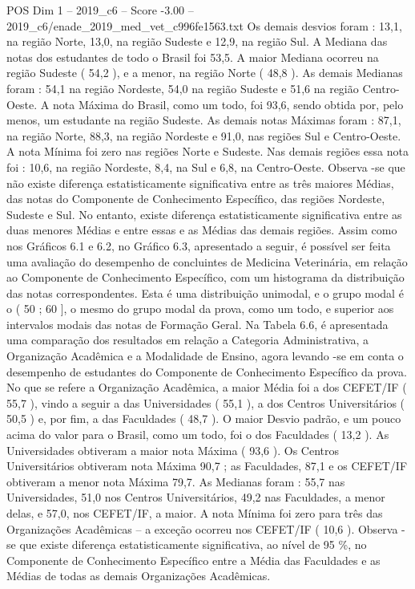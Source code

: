\begin{textsample}{POS Dim 1 – 2019\_c6 – Score -3.00 – 2019\_c6/enade\_2019\_med\_vet\_c996fe1563.txt}
Os demais desvios foram : 13,1, na região Norte, 13,0, na região Sudeste e 12,9, na região Sul.
A Mediana das notas dos estudantes de todo o Brasil foi 53,5.
A maior Mediana ocorreu na região Sudeste ( 54,2 ), e a menor, na região Norte ( 48,8 ).
As demais Medianas foram : 54,1 na região Nordeste, 54,0 na região Sudeste e 51,6 na região Centro-Oeste.
A nota Máxima do Brasil, como um todo, foi 93,6, sendo obtida por, pelo menos, um estudante na região Sudeste.
As demais notas Máximas foram : 87,1, na região Norte, 88,3, na região Nordeste e 91,0, nas regiões Sul e Centro-Oeste.
A nota Mínima foi zero nas regiões Norte e Sudeste.
Nas demais regiões essa nota foi : 10,6, na região Nordeste, 8,4, na Sul e 6,8, na Centro-Oeste.
Observa -se que não existe diferença estatisticamente significativa entre as três maiores Médias, das notas do Componente de Conhecimento Específico, das regiões Nordeste, Sudeste e Sul.
No entanto, existe diferença estatisticamente significativa entre as duas menores Médias e entre essas e as Médias das demais regiões.
Assim como nos Gráficos 6.1 e 6.2, no Gráfico 6.3, apresentado a seguir, é possível ser feita uma avaliação do desempenho de concluintes de Medicina Veterinária, em relação ao Componente de Conhecimento Específico, com um histograma da distribuição das notas correspondentes.
Esta é uma distribuição unimodal, e o grupo modal é o ( 50 ; 60 ], o mesmo do grupo modal da prova, como um todo, e superior aos intervalos modais das notas de Formação Geral.
Na Tabela 6.6, é apresentada uma comparação dos resultados em relação a Categoria Administrativa, a Organização Acadêmica e a Modalidade de Ensino, agora levando -se em conta o desempenho de estudantes do Componente de Conhecimento Específico da prova.
No que se refere a Organização Acadêmica, a maior Média foi a dos CEFET/IF ( 55,7 ), vindo a seguir a das Universidades ( 55,1 ), a dos Centros Universitários ( 50,5 ) e, por fim, a das Faculdades ( 48,7 ).
O maior Desvio padrão, e um pouco acima do valor para o Brasil, como um todo, foi o dos Faculdades ( 13,2 ).
As Universidades obtiveram a maior nota Máxima ( 93,6 ).
Os Centros Universitários obtiveram nota Máxima 90,7 ; as Faculdades, 87,1 e os CEFET/IF obtiveram a menor nota Máxima 79,7.
As Medianas foram : 55,7 nas Universidades, 51,0 nos Centros Universitários, 49,2 nas Faculdades, a menor delas, e 57,0, nos CEFET/IF, a maior.
A nota Mínima foi zero para três das Organizações Acadêmicas – a exceção ocorreu nos CEFET/IF ( 10,6 ).
Observa -se que existe diferença estatisticamente significativa, ao nível de 95 \%, no Componente de Conhecimento Específico entre a Média das Faculdades e as Médias de todas as demais Organizações Acadêmicas.

\end{textsample}
